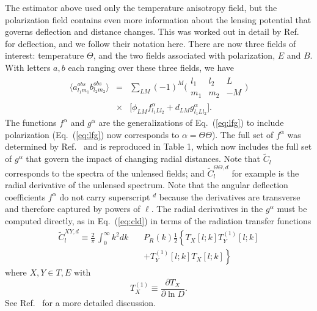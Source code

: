 \documentclass[prl,amsmath,amssymb,floatfix,superscriptaddress,nofootinbib,twocolumn]{revtex4-1}
\def\bea{\begin{eqnarray}}
\def\eea{\end{eqnarray}}
\newcommand{\vs}{\nonumber\\}
\newcommand{\ec}[1]{Eq.~(\ref{eq:#1})}
\newcommand{\scott}[1]{{\color{darkgreen} #1}}
\newcommand{\wh}[1]{{\color{red} #1}}
\begin{document}
The estimator above used only the temperature anisotropy field, but the polarization field contains even more information about the lensing potential that governs deflection and distance changes. This was worked out in detail by Ref.~\cite{Okamoto:2003zw} for deflection, and we follow their notation here. There are now three fields of interest: temperature $\Theta$, and the two fields associated with polarization, $E$ and $B$. With letters $a,b$ each ranging over these three fields, we have 
\bea
\langle a^{obs}_{l_{1}m_{1}}b^{obs}_{l_{2}m_{2}}\rangle &=& \sum_{LM}(-1)^{M}\bigl(\begin{smallmatrix} l_1 & l_2 & L \\ m_1 & m_2 & -M  \end{smallmatrix}\bigr)\nonumber \\
&\times&
\big[ \phi_{LM}f^{\alpha}_{l_{1}Ll_{2}} + d_{LM}g^{\alpha}_{l_{1}Ll_{2}} \big] 
.\eea
The functions $f^\alpha$ and $g^\alpha$ are the generalizations of \ec{lfg} to include polarization (\ec{lfg} now corresponds to $\alpha=\Theta\Theta$). The full set of $f^{\alpha}$ was determined by Ref.~\cite{Okamoto:2003zw} and is reproduced in Table 1, which now includes the full set of $g^{\alpha}$ that govern the impact of changing radial distances. Note that $\tilde C_l$ corresponds to the spectra of the unlensed fields; and $\tilde C_l^{\Theta\Theta,d}$ for example is the radial derivative of the unlensed spectrum.%
Note that the angular deflection coefficients $f^\alpha$ do not carry superscript $^d$ because the derivatives are transverse and therefore captured by powers of $\ell$. The radial derivatives in the $g^\alpha$ must be computed directly, as in \ec{cld} in terms of the radiation  
transfer functions
\bea
\tilde{C}^{XY,d}_{l} \equiv \frac{2}{\pi}\,\int_0^\infty k^{2}dk \,&&{P}_{R}(k)\frac{1}{2} \left\{T_{X}[l;k]T_{Y}^{(1)}[l;k]\right. \vs
&& \left.+ T^{(1)}_{Y}[l;k]T_{X}[l;k] \right\}
\eea
where $X, Y \in T, E$ with  
\begin{equation}
T_X^{(1)} \equiv \frac{\partial T_X}{\partial \ln D}.
\end{equation}
 See Ref.~\cite{Hu:1997de} for a more detailed discussion.
\end{document}
